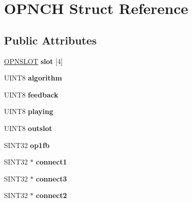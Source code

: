\hypertarget{structOPNCH}{\section{O\-P\-N\-C\-H Struct Reference}
\label{structOPNCH}
}
\subsection*{Public Attributes}
\begin{DoxyCompactItemize}
\item 
\hypertarget{structOPNCH_ad32d002d7c98cb1ba210dbd69df9d849}{\hyperlink{structOPNSLOT}{O\-P\-N\-S\-L\-O\-T} {\bfseries slot} \mbox{[}4\mbox{]}}\label{structOPNCH_ad32d002d7c98cb1ba210dbd69df9d849}

\item 
\hypertarget{structOPNCH_ad8bd7ca60f82d70dbc3d54f318f3992d}{U\-I\-N\-T8 {\bfseries algorithm}}\label{structOPNCH_ad8bd7ca60f82d70dbc3d54f318f3992d}

\item 
\hypertarget{structOPNCH_a08ea0687a2c4e60ea778b9fb0a380c53}{U\-I\-N\-T8 {\bfseries feedback}}\label{structOPNCH_a08ea0687a2c4e60ea778b9fb0a380c53}

\item 
\hypertarget{structOPNCH_a1fefaaa1788f9b13ed1a559cbd1db829}{U\-I\-N\-T8 {\bfseries playing}}\label{structOPNCH_a1fefaaa1788f9b13ed1a559cbd1db829}

\item 
\hypertarget{structOPNCH_a568ab902c5b5d61a903bd4e96dcfdca5}{U\-I\-N\-T8 {\bfseries outslot}}\label{structOPNCH_a568ab902c5b5d61a903bd4e96dcfdca5}

\item 
\hypertarget{structOPNCH_adee43fe566ff7157648273ffad778a5c}{S\-I\-N\-T32 {\bfseries op1fb}}\label{structOPNCH_adee43fe566ff7157648273ffad778a5c}

\item 
\hypertarget{structOPNCH_a53abf18b8a0c1aba168579cd39c23d8c}{S\-I\-N\-T32 $\ast$ {\bfseries connect1}}\label{structOPNCH_a53abf18b8a0c1aba168579cd39c23d8c}

\item 
\hypertarget{structOPNCH_aaff979b913bb243ff5447957f87f2fc9}{S\-I\-N\-T32 $\ast$ {\bfseries connect3}}\label{structOPNCH_aaff979b913bb243ff5447957f87f2fc9}

\item 
\hypertarget{structOPNCH_a629c3224d8583b79c0fe03948f518dcd}{S\-I\-N\-T32 $\ast$ {\bfseries connect2}}\label{structOPNCH_a629c3224d8583b79c0fe03948f518dcd}


\end{DoxyCompactItemize}
